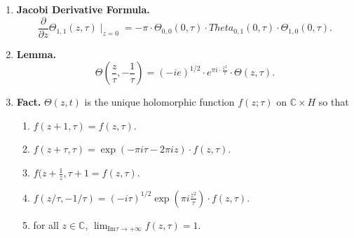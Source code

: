 \begin{enumerate}
	\item \textbf{Jacobi Derivative Formula. } 
	$$
	\frac{\partial}{\partial z} \Theta_{1,1}(z,\tau) \mid_{z=0} = -\pi \cdot \Theta_{0,0}(0,\tau) \cdot Theta_{0,1}(0,\tau) \cdot \Theta_{1,0}(0,\tau). 
	$$
	\item \textbf{Lemma. } 
	$$
	\Theta(\frac{z}{\tau}, -\frac{1}{\tau}) = (-ie)^{1/2} \cdot e^{\pi i \cdot \frac{z^2}{\tau}} \cdot \Theta(z,\tau). 
	$$
	\item \textbf{Fact. } $\Theta(z,t)$ is the unique holomorphic function $f(z;\tau)$ on $\mathbb{C} \times H$ so that 
	\begin{enumerate}
		\item $f(z+1,\tau) = f(z,\tau)$. 
		\item $f(z+\tau,\tau) = \exp(-\pi i \tau - 2\pi i z) \cdot f(z,\tau)$. 
		\item $f(z+\frac{1}{z},\tau+1 = f(z,\tau)$. 
		\item $f(z/\tau, -1/\tau) = (-i\tau)^{1/2}\exp(\pi i \frac{z^2}{\tau}) \cdot f(z,\tau)$. 
		\item for all $z \in \mathbb{C}$, $\lim_{\textrm{Im} \tau \to +\infty} f(z,\tau) = 1$. 
	\end{enumerate}
\end{enumerate}  
 

